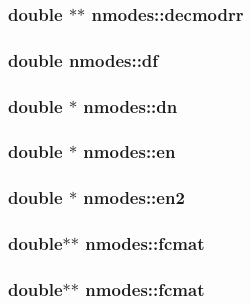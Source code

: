 \subsubsection{\setlength{\rightskip}{0pt plus 5cm}double $\ast$$\ast$ {\bf nmodes::decmodrr}}\label{structnmodes_f7e79a28834c17742733d98ffab50014}


\subsubsection{\setlength{\rightskip}{0pt plus 5cm}double {\bf nmodes::df}}\label{structnmodes_5b0279c254ce4ca56f5b9c6d16b1c190}


\subsubsection{\setlength{\rightskip}{0pt plus 5cm}double $\ast$ {\bf nmodes::dn}}\label{structnmodes_f73ef6f174b29f04bb82ec767daa500d}


\subsubsection{\setlength{\rightskip}{0pt plus 5cm}double $\ast$ {\bf nmodes::en}}\label{structnmodes_1724d414a95757a211602c08aae372da}


\subsubsection{\setlength{\rightskip}{0pt plus 5cm}double $\ast$ {\bf nmodes::en2}}\label{structnmodes_746b0e1b45bebcfe3321999ac8c596c5}


\subsubsection{\setlength{\rightskip}{0pt plus 5cm}double$\ast$$\ast$ {\bf nmodes::fcmat}}\label{structnmodes_5ca8142ad0a95864b491a834d14d80a7}


\subsubsection{\setlength{\rightskip}{0pt plus 5cm}double$\ast$$\ast$ {\bf nmodes::fcmat}}\label{structnmodes_5ca8142ad0a95864b491a834d14d80a7}


